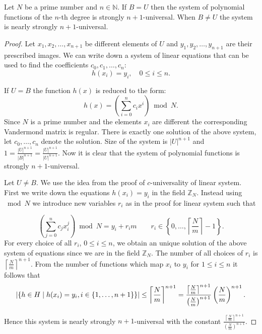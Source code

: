 \begin{remark}
Let $N$ be a prime number and $n \in \mathbb{N}$. If $B = U$ then the system of polynomial functions of the $n$-th degree is strongly $n + 1$-universal. When $B \neq U$ the system is nearly strongly $n + 1$-universal.
\end{remark}
\begin{proof}
Let $x_1, x_2, \dots, x_{n+1}$ be different elements of $U$ and $y_1, y_2, \dots, y_{n+1}$ are their prescribed images. We can write down a system of linear equations that can be used to find the coefficients $c_0, c_1, \dots, c_n$:
\[ 
h(x_i) = y_i, \quad 0 \leq i \leq n \text{.}
\]

If $U = B$ the function $h(x)$ is reduced to the form: \[ h(x) = \left( \displaystyle \sum_{i=0}^{n} c_i x^i \right) \bmod N \text{.} \] Since $N$ is a prime number and the elements $x_i$ are different the corresponding Vandermond matrix is regular. There is exactly one solution of the above system, let $c_0, \dots, c_n$ denote the solution. Size of the system is ${|U|}^{n+1}$ and $1 = \frac{|U| ^ {n + 1}}{|B|^{n + 1}} = \frac{|U| ^ {n + 1}}{|U|^{n + 1}}$. Now it is clear that the system of polynomial functions is strongly $n + 1$-universal.

Let $U \neq B$. We use the idea from the proof of $c$-universality of linear system. First we write down the equations $h(x_i) = y_i$ in the field $\mathbb{Z}_N$. Instead using $\bmod N$ we introduce new variables $r_i$ as in the proof for linear system such that

\begin{displaymath}
\left(\displaystyle \sum_{j=0}^{n} c_j x_{i}^{j} \right) \bmod N = {y}_i + {r_i}{m} \qquad r_i \in \left\{0, \dots, \left\lceil \frac{N}{m} \right\rceil - 1 \right\} \text{.}
\end{displaymath}
For every choice of all $r_i$, $0 \leq i \leq n$, we obtain an unique solution of the above system of equations since we are in the field $\mathbb{Z}_N$. The number of all choices of $r_i$ is ${\left\lceil \frac{N}{m} \right\rceil}^{n + 1}$. From the number of functions which map $x_i$ to $y_i$ for $1 \leq i \leq n$ it follows that
\begin{displaymath}
|\{h \in H \mid h(x_i) = y_i, i \in \{1, \dots, n + 1\}\}| \leq {\left\lceil \frac{N}{m} \right\rceil}^{n + 1} = \frac{{\left\lceil \frac{N}{m} \right\rceil}^{n + 1}}{\left(\frac{N}{m}\right)^{n + 1}}\left(\frac{N}{m}\right)^{n+1} \text{.}
\end{displaymath}

Hence this system is nearly strongly $n+1$-universal with the constant $\frac{{\left\lceil \frac{N}{m} \right\rceil}^{n + 1}}{\left(\frac{N}{m}\right)^{n+1}}$.
\end{proof}

